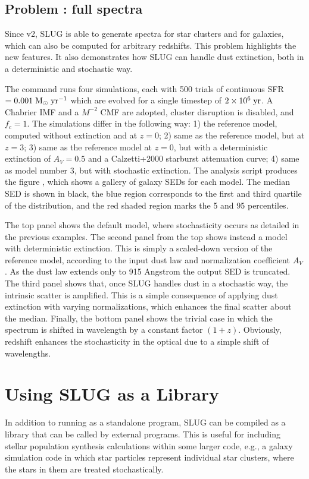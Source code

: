 \documentclass[letterpaper,10pt,english]{sphinxmanual}
\begin{document}
\section{Problem : full spectra}
\label{\detokenize{tests:problem-spectra-full-spectra}}
Since v2, SLUG is able to generate spectra for star clusters and for galaxies, which can also be computed for
arbitrary redshifts. This problem highlights the new features.
It also demonstrates how SLUG can handle dust extinction, both in a deterministic and stochastic way.

The command   runs four  simulations, each with 500 trials
of continuous SFR \(=0.001\rm\;M_\odot\;yr^{-1}\) which are evolved for a
single timestep of  \(2\times 10^6\rm\;yr\). A Chabrier IMF and a \(M^{-2}\)
CMF are adopted, cluster disruption is disabled, and \(f_c = 1\).
The simulations differ in the following way:
1) the reference model, computed without extinction and at \(z = 0\);
2) same as the reference model, but at \(z = 3\);
3) same as the reference model at \(z = 0\), but with a deterministic extinction of \(A_V = 0.5\) and
a Calzetti+2000 starburst attenuation curve;
4) same as model number 3, but with stochastic extinction.
The analysis script  produces the figure ,
which shows a gallery of galaxy SEDs for each model. The median SED is shown in black, the blue region
corresponds to the first and third quartile of the distribution, and the red shaded region
marks the 5 and 95 percentiles.

The top panel shows the default model, where stochasticity occurs as detailed in the previous examples.
The second panel from the top shows instead a model with deterministic extinction. This is simply
a scaled-down version of the reference model, according to the input dust law and normalization
coefficient \(A_V\). As the dust law extends only to 915 Angstrom the output SED is truncated.
The third panel shows that, once SLUG handles dust  in a stochastic way, the intrinsic scatter is
amplified. This is a simple consequence of applying dust extinction with varying normalizations, which
enhances the final scatter about the median. Finally, the bottom panel shows the trivial case in which
the spectrum is shifted in wavelength by a constant factor \((1+z)\). Obviously, redshift enhances
the stochasticity in the optical due to a simple shift of wavelengths.


\chapter{Using SLUG as a Library}
\label{\detokenize{library:sec-library-mode}}\label{\detokenize{library::doc}}\label{\detokenize{library:using-slug-as-a-library}}
In addition to running as a standalone program, SLUG can be
compiled as a library that can be called by external programs. This is
useful for including stellar population synthesis calculations within
some larger code, e.g., a galaxy simulation code in which star
particles represent individual star clusters, where the stars in them
are treated stochastically.
\end{document}
